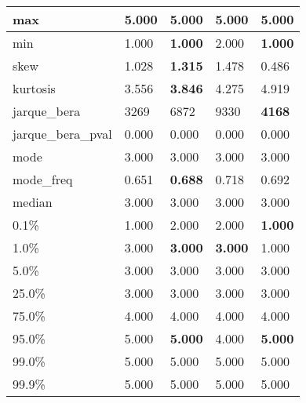 \begin{table}[H]
\begin{tabular}{|l|m{10em}|m{10em}|m{10em}|m{10em}|}
\hline max & 5.000 & 5.000 & 5.000 & 5.000 \\
\hline min & 1.000 & \bfseries 1.000 & \cellcolor[rgb]{0.9, 0.54, 0.52} 2.000 & \bfseries 1.000 \\
\hline skew & 1.028 & \bfseries 1.315 & 1.478 & \cellcolor[rgb]{0.9, 0.54, 0.52} 0.486 \\
\hline kurtosis & 3.556 & \bfseries 3.846 & 4.275 & \cellcolor[rgb]{0.9, 0.54, 0.52} 4.919 \\
\hline jarque\_bera & 3269 & 6872 & \cellcolor[rgb]{0.9, 0.54, 0.52} 9330 & \bfseries 4168 \\
\hline jarque\_bera\_pval & 0.000 & 0.000 & 0.000 & 0.000 \\
\hline mode & 3.000 & 3.000 & 3.000 & 3.000 \\
\hline mode\_freq & 0.651 & \bfseries 0.688 & \cellcolor[rgb]{0.9, 0.54, 0.52} 0.718 & 0.692 \\
\hline median & 3.000 & 3.000 & 3.000 & 3.000 \\
\hline 0.1\% & 1.000 & \cellcolor[rgb]{0.9, 0.54, 0.52} 2.000 & \cellcolor[rgb]{0.9, 0.54, 0.52} 2.000 & \bfseries 1.000 \\
\hline 1.0\% & 3.000 & \bfseries 3.000 & \bfseries 3.000 & \cellcolor[rgb]{0.9, 0.54, 0.52} 1.000 \\
\hline 5.0\% & 3.000 & 3.000 & 3.000 & 3.000 \\
\hline 25.0\% & 3.000 & 3.000 & 3.000 & 3.000 \\
\hline 75.0\% & 4.000 & 4.000 & 4.000 & 4.000 \\
\hline 95.0\% & 5.000 & \bfseries 5.000 & \cellcolor[rgb]{0.9, 0.54, 0.52} 4.000 & \bfseries 5.000 \\
\hline 99.0\% & 5.000 & 5.000 & 5.000 & 5.000 \\
\hline 99.9\% & 5.000 & 5.000 & 5.000 & 5.000 \\
\hline
\end{tabular}
\end{table}
